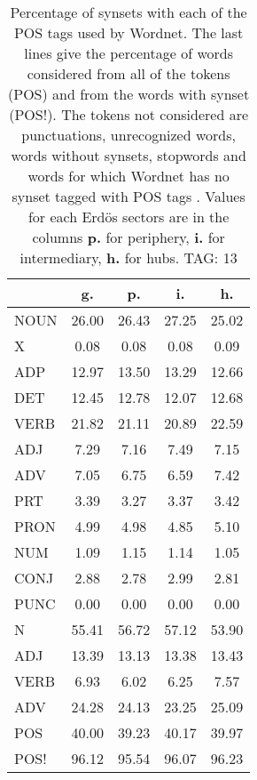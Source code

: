 \begin{table}[h!]
\begin{center}
\begin{tabular}{| l || c | c | c | c |}\hline
 & {\bf g.} & {\bf p.} & {\bf i.} & {\bf h.} \\\hline\hline
NOUN & 26.00  & 26.43  & 27.25  & 25.02 \\
X & 0.08  & 0.08  & 0.08  & 0.09 \\\hline
ADP & 12.97  & 13.50  & 13.29  & 12.66 \\
DET & 12.45  & 12.78  & 12.07  & 12.68 \\\hline
VERB & 21.82  & 21.11  & 20.89  & 22.59 \\\hline
ADJ & 7.29  & 7.16  & 7.49  & 7.15 \\
ADV & 7.05  & 6.75  & 6.59  & 7.42 \\\hline
PRT & 3.39  & 3.27  & 3.37  & 3.42 \\
PRON & 4.99  & 4.98  & 4.85  & 5.10 \\
NUM & 1.09  & 1.15  & 1.14  & 1.05 \\
CONJ & 2.88  & 2.78  & 2.99  & 2.81 \\
PUNC & 0.00  & 0.00  & 0.00  & 0.00 \\\hline\hline\hline
N & 55.41  & 56.72  & 57.12  & 53.90 \\\hline
ADJ & 13.39  & 13.13  & 13.38  & 13.43 \\\hline
VERB & 6.93  & 6.02  & 6.25  & 7.57 \\\hline
ADV & 24.28  & 24.13  & 23.25  & 25.09 \\\hline\hline
POS & 40.00  & 39.23  & 40.17  & 39.97 \\\hline
POS! & 96.12  & 95.54  & 96.07  & 96.23 \\\hline
\end{tabular}
\caption{Percentage of synsets with each of the POS tags used by Wordnet. The last lines give the percentage of words considered from all of the tokens (POS) and from the words with synset (POS!). The tokens not considered are punctuations, unrecognized words, words without synsets, stopwords and words for which Wordnet has no synset  tagged with POS tags . Values for each Erd\"os sectors are in the columns {{\bf p.}} for periphery, {{\bf i.}} for intermediary, {{\bf h.}} for hubs. TAG: 13}
\end{center}
\end{table}